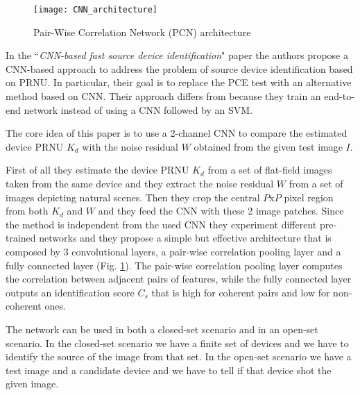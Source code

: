 \begin{figure}[ht!]
    \centering
    \texttt{[image: CNN\_architecture]}
    \caption{Pair-Wise Correlation Network (PCN) architecture}
    \label{fig:CNN_architecture}
\end{figure}

In the ``\textit{CNN-based fast source device identification}" \cite{Mandelli} paper the authors propose a CNN-based approach to address the problem of source device identification based on PRNU. 
In particular, their goal is to replace the PCE test with an alternative method based on CNN. Their approach differs from \cite{Bondi}
because they train an end-to-end network instead of using a CNN followed by an SVM.

The core idea of this paper is to use a 2-channel CNN to compare the estimated device PRNU $K_d$ with the noise residual $W$ 
obtained from the given test image $I$.

First of all they estimate the device PRNU\cite{Lukas} $K_d$ from a set of flat-field images taken from the same device and they extract the
noise residual $W$ from a set of images depicting natural scenes.
Then they crop the central $P$x$P$ pixel region from both $K_d$ and $W$ and they feed the CNN with these 2 image patches.
Since the method is independent from the used CNN they experiment different pre-trained networks and they propose a simple but 
effective architecture that is composed by 3 convolutional layers, a pair-wise correlation pooling layer and a fully connected 
layer (Fig. \ref{fig:CNN_architecture}). The pair-wise correlation pooling layer computes the correlation between adjacent pairs of features, while the
fully connected layer outputs an identification score $C_s$ that is high for coherent pairs and low for non-coherent ones. 

The network can be used in both a closed-set scenario and in an open-set scenario. In the closed-set scenario we have a finite set 
of devices and we have to identify the source of the image from that set. In the open-set scenario we have a test image and a candidate
device and we have to tell if that device shot the given image.

